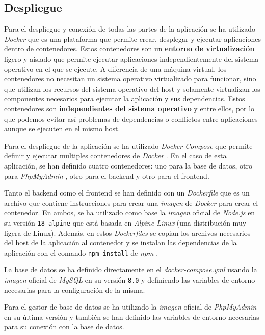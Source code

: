 \subsection{Despliegue}
Para el despliegue y conexión de todas las partes de la aplicación se ha utilizado
\textit{Docker} \cite{docker} que es una plataforma que permite crear, desplegar y ejecutar
aplicaciones dentro de contenedores. Estos contenedores son un \textbf{entorno de
virtualización} ligero y aislado que permite ejecutar aplicaciones independientemente del
sistema operativo en el que se ejecute. A diferencia de una máquina virtual, los contenedores
no necesitan un sistema operativo virtualizado para funcionar, sino que utilizan los recursos
del sistema operativo del host y solamente virtualizan los componentes necesarios para
ejecutar la aplicación y sus dependencias. Estos contenedores son \textbf{independientes del
sistema operativo} y entre ellos, por lo que podemos evitar así problemas de dependencias o
conflictos entre aplicaciones aunque se ejecuten en el mismo host.

Para el despliegue de la aplicación se ha utilizado \textit{Docker Compose}
\cite{docker-compose} que permite definir y ejecutar multiples contenedores de \textit{Docker}
\cite{docker}. En el caso de esta aplicación, se han definido cuatro contenedores: uno para
la base de datos, otro para \textit{PhpMyAdmin} \cite{phpmyadmin}, otro para el backend y
otro para el frontend.

Tanto el backend como el frontend se han definido con un \textit{Dockerfile} \cite{dockerfile}
que es un archivo que contiene instrucciones para crear una \textit{imagen} de \textit{Docker}
para crear el contenedor. En ambos, se ha utilizado como base la \textit{imagen} oficial
de \textit{Node.js} \cite{nodejs-docker} en su versión \texttt{18-alpine} que está basada en
\textit{Alpine Linux} \cite{alpine-linux} (una distribución muy ligera de Linux). Además,
en estos \textit{Dockerfiles} se copian los archivos necesarios del host de la aplicación al
contenedor y se instalan las dependencias de la aplicación con el comando \texttt{npm install}
de \textit{npm} \cite{npm}.

La base de datos se ha definido directamente en el \textit{docker-compose.yml} usando la
\textit{imagen} oficial de \textit{MySQL} \cite{mysql-docker} en su versión \texttt{8.0}
y definiendo las variables de entorno necesarias para la configuración de la misma.

Para el gestor de base de datos se ha utilizado la \textit{imagen} oficial de
\textit{PhpMyAdmin} \cite{phpmyadmin-docker} en su última versión y también se han definido
las variables de entorno necesarias para su conexión con la base de datos.